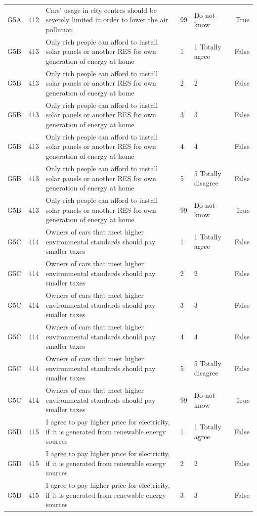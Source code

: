 \begin{tabular}{lrlllr}
G5A & 412 & Cars’ usage in city centres should be severely limited in order to lower the air pollution & 99 & Do not know & True \\
G5B & 413 & Only rich people can afford to install solar panels or another RES for own generation of energy at home & 1 & 1  Totally agree & False \\
G5B & 413 & Only rich people can afford to install solar panels or another RES for own generation of energy at home & 2 & 2 & False \\
G5B & 413 & Only rich people can afford to install solar panels or another RES for own generation of energy at home & 3 & 3 & False \\
G5B & 413 & Only rich people can afford to install solar panels or another RES for own generation of energy at home & 4 & 4 & False \\
G5B & 413 & Only rich people can afford to install solar panels or another RES for own generation of energy at home & 5 & 5 Totally disagree & False \\
G5B & 413 & Only rich people can afford to install solar panels or another RES for own generation of energy at home & 99 & Do not know & True \\
G5C & 414 & Owners of cars that meet higher environmental standards should pay smaller taxes & 1 & 1  Totally agree & False \\
G5C & 414 & Owners of cars that meet higher environmental standards should pay smaller taxes & 2 & 2 & False \\
G5C & 414 & Owners of cars that meet higher environmental standards should pay smaller taxes & 3 & 3 & False \\
G5C & 414 & Owners of cars that meet higher environmental standards should pay smaller taxes & 4 & 4 & False \\
G5C & 414 & Owners of cars that meet higher environmental standards should pay smaller taxes & 5 & 5 Totally disagree & False \\
G5C & 414 & Owners of cars that meet higher environmental standards should pay smaller taxes & 99 & Do not know & True \\
G5D & 415 & I agree to pay higher price for electricity, if it is generated from renewable energy sources & 1 & 1  Totally agree & False \\
G5D & 415 & I agree to pay higher price for electricity, if it is generated from renewable energy sources & 2 & 2 & False \\
G5D & 415 & I agree to pay higher price for electricity, if it is generated from renewable energy sources & 3 & 3 & False \\

\end{tabular}
